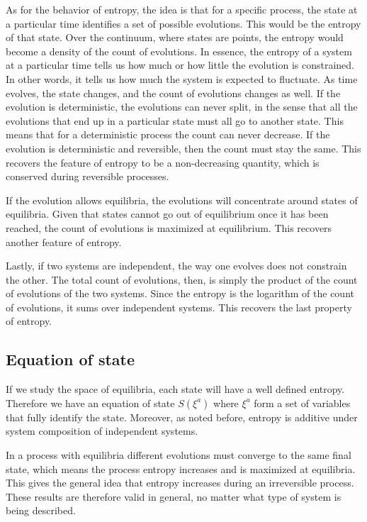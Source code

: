 \documentclass[11pt,letterpaper,fleqn]{memoir} %
\begin{document}
As for the behavior of entropy, the idea is that for a specific process, the state at a particular time identifies a set of possible evolutions. This would be the entropy of that state. Over the continuum, where states are points, the entropy would become a density of the count of evolutions. In essence, the entropy of a system at a particular time tells us how much or how little the evolution is constrained. In other words, it tells us how much the system is expected to fluctuate.  As time evolves, the state changes, and the count of evolutions changes as well. If the evolution is deterministic, the evolutions can never split, in the sense that all the evolutions that end up in a particular state must all go to another state. This means that for a deterministic process the count can never decrease. If the evolution is deterministic and reversible, then the count must stay the same. This recovers the feature of entropy to be a non-decreasing quantity, which is conserved during reversible processes.

If the evolution allows equilibria, the evolutions will concentrate around states of equilibria. Given that states cannot go out of equilibrium once it has been reached, the count of evolutions is maximized at equilibrium. This recovers another feature of entropy.

Lastly, if two systems are independent, the way one evolves does not constrain the other. The total count of evolutions, then, is simply the product of the count of evolutions of the two systems. Since the entropy is the logarithm of the count of evolutions, it sums over independent systems. This recovers the last property of entropy.

\subsection{Equation of state}

If we study the space of equilibria, each state will have a well defined entropy. Therefore we have an equation of state $S(\xi^a)$ where $\xi^a$ form a set of variables that fully identify the state. Moreover, as noted before, entropy is additive under system composition of independent systems.

In a process with equilibria different evolutions must converge to the same final state, which means the process entropy increases and is maximized at equilibria. This gives the general idea that entropy increases during an irreversible process. These results are therefore valid in general, no matter what type of system is being described.
\end{document}
